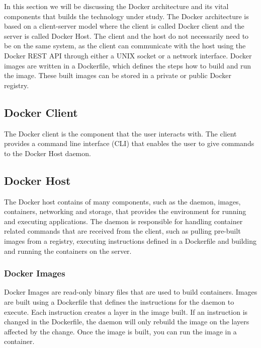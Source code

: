 \documentclass[fleqn,12pt]{olplainarticle}
\begin{document}
In this section we will be discussing the Docker architecture and its vital components that builds the technology under study. The Docker architecture is based on a client-server model where the client is called Docker client and the server is called Docker Host\cite{docker:overview, aquasec:docker_architecture}. The client and the host do not necessarily need to be on the same system, as the client can communicate with the host using the Docker REST API through either a UNIX socket or a network interface. Docker images are written in a Dockerfile, which defines the steps how to build and run the image. These built images can be stored in a private or public Docker registry.

\subsection{Docker Client}

The Docker client is the component that the user interacts with. The client provides a command line interface (CLI) that enables the user to give commands to the Docker Host daemon.

\subsection{Docker Host}

The Docker host contains of many components, such as the daemon, images, containers, networking and storage, that provides the environment for running and executing applications\cite{aquasec:docker_architecture}. The daemon is responsible for handling container related commands that are received from the client, such as pulling pre-built images from a registry, executing instructions defined in a Dockerfile and building and running the containers on the server.

\subsubsection{Docker Images}

Docker Images are read-only binary files that are used to build containers\cite{docker:overview}. Images are built using a Dockerfile that defines the instructions for the daemon to execute. Each instruction creates a layer in the image built. If an instruction is changed in the Dockerfile, the daemon will only rebuild the image on the layers affected by the change. Once the image is built, you can run the image in a container.
\end{document}
